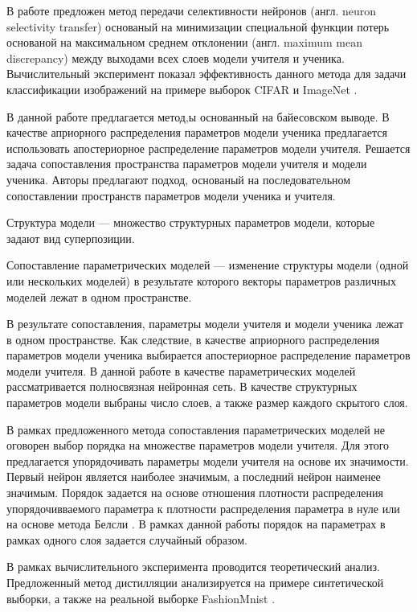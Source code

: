 В работе \cite{Zehao2017} предложен метод передачи селективности нейронов (англ. neuron selectivity transfer) основаный на минимизации специальной функции потерь основаной на максимальном среднем отклонении (англ. maximum mean discrepancy) между выходами всех слоев модели учителя и ученика. Вычислительный эксперимент показал эффективность данного метода для задачи классификации изображений на примере выборок CIFAR \cite{cifar10} и ImageNet \cite{imagenet}.

В данной работе предлагается метод,ы основанный на байесовском выводе.
В качестве априорного распределения параметров модели ученика предлагается использовать апостериорное распределение параметров модели учителя.
Решается задача сопоставления пространства параметров модели учителя и модели ученика.
Авторы предлагают подход, основаный на последовательном сопоставлении пространств параметров модели ученика и учителя. 
\begin{definition}
\label{def:structure}
Структура модели --- множество структурных параметров модели, которые задают вид суперпозиции.
\end{definition}
\begin{definition}
\label{def:sopos}
Сопоставление параметрических моделей --- изменение структуры модели (одной или нескольких моделей) в результате которого векторы параметров различных моделей лежат в одном пространстве.
\end{definition}
В результате сопоставления, параметры модели учителя и модели ученика лежат в одном пространстве.
Как следствие, в качестве априорного распределения параметров модели ученика выбирается апостериорное распределение параметров модели учителя.
В данной работе в качестве параметрических моделей рассматривается полносвязная нейронная сеть.
В качестве структурных параметров модели выбраны число слоев, а также размер каждого скрытого слоя.

В рамках предложенного метода сопоставления параметрических моделей не оговорен выбор порядка на множестве параметров модели учителя.
Для этого предлагается упорядочивать параметры модели учителя на основе их значимости.
Первый нейрон является наиболее значимым, а последний нейрон наименее значимым.
Порядок задается на основе отношения плотности распределения упорядочивваемого параметра к плотности распределения параметра в нуле \cite{graves2011} или на основе метода Белсли \cite{grabovoy2019}.
В рамках данной работы порядок на параметрах в рамках одного слоя задается случайный образом.

В рамках вычислительного эксперимента проводится теоретический анализ. Предложенный метод дистилляции анализируется на примере синтетической выборки, а также на реальной выборке FashionMnist \cite{fashionmnist}.

